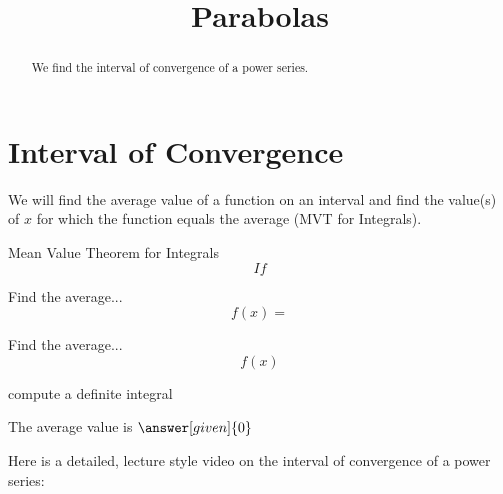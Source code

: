 \documentclass{ximera}
\title{Parabolas}
\begin{document}
\begin{abstract}
We find the interval of convergence of a power series.
\end{abstract}

\maketitle

\section{Interval of Convergence}

We will find the average value of a function on an interval 
and find the value(s) of $x$ for which the function equals the 
average (MVT for Integrals).

\begin{theorem} Mean Value Theorem for Integrals 
\[
If
\]
\end{theorem}






\begin{example} %
Find the average...
 \[
  f(x) = 
  \]
\end{example}

\begin{center}
\begin{foldable}
\end{foldable}
\end{center}


\begin{problem} %
  Find the average...
  \[
  f(x)
  \]
    \begin{hint}
      compute a definite integral
    \end{hint}
    
		
		The average value is
		 $\answer[given]{0}$
\end{problem}


\begin{center}
\begin{foldable}
\end{foldable}
\end{center}

\begin{center}
\begin{foldable}
Here is a detailed, lecture style video on the interval of convergence of a power series:
\end{foldable}
\end{center}
\end{document}
